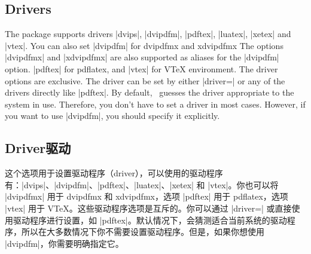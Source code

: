 
\begin{paracol}{2}
\subsection{Drivers}\label{sec:drivers}
The package supports drivers |dvips|, |dvipdfm|, |pdftex|, |luatex|,
|xetex| and |vtex|. You can also set |dvipdfm| for \textsf{dvipdfmx} and
\textsf{xdvipdfmx} The options |dvipdfmx| and |xdvipdfmx| are also supported
as aliases for the |dvipdfm| option.
|pdftex| for \textsf{pdflatex}, and |vtex| for
V\TeX{} environment.
The driver options are exclusive. The driver can be set by either
|driver=| or any of the drivers directly like |pdftex|.
By default, \Gm\ guesses the driver appropriate to the system
in use. Therefore, you don't have to set a driver in most cases.
However, if you want to use |dvipdfm|, you should specify it explicitly.
\switchcolumn
\subsection{Driver驱动}
这个选项用于设置驱动程序（driver），可以使用的驱动程序有：|dvips|、|dvipdfm|、|pdftex|、|luatex|、|xetex| 和 |vtex|。你也可以将 |dvipdfmx| 用于 \textsf{dvipdfmx} 和 \textsf{xdvipdfmx}，选项 |pdftex| 用于 \textsf{pdflatex}，选项 |vtex| 用于 V\TeX{}。这些驱动程序选项是互斥的。你可以通过 |driver=| 或直接使用驱动程序进行设置，如 |pdftex|。默认情况下，\Gm 会猜测适合当前系统的驱动程序，所以在大多数情况下你不需要设置驱动程序。但是，如果你想使用 |dvipdfm|，你需要明确指定它。
\end{paracol}

